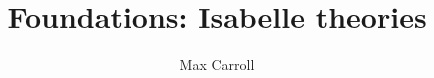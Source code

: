 \documentclass[11pt,a4paper]{article}
\begin{document}
\title{Foundations: Isabelle theories}
\author{Max Carroll}
\maketitle


\end{document}

